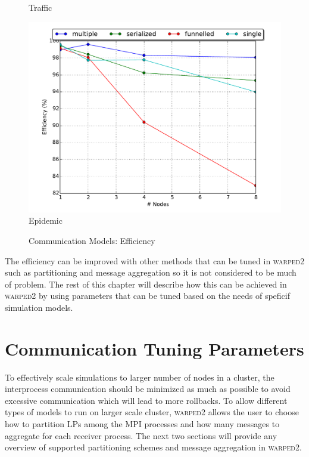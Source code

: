 \documentclass[11pt]{book}
\begin{document}
\begin{figure}
\begin{minipage}{.5\textwidth}
\begin{center}
      Traffic \\
    \end{center}
  \end{minipage}
  \centering
  \begin{minipage}{.5\textwidth}
    \begin{center}
      \includegraphics[width=\textwidth,keepaspectratio,quiet]{figs/partitioning_communication/communication_epidemic_efficiency.pdf} \\
      Epidemic \\
    \end{center}
  \end{minipage}
  \caption{Communication Models: Efficiency}\label{communication_model_efficiency}
\end{figure}

The efficiency can be improved with other methods that can be tuned in \textsc{warped2} such as
partitioning and message aggregation so it is not considered to be much of problem.  The rest of
this chapter will describe how this can be achieved in \textsc{warped2} by using parameters that can
be tuned based on the needs of speficif simulation models.

\section{Communication Tuning Parameters}

To effectively scale simulations to larger number of nodes in a cluster, the interprocess
communication should be minimized as much as possible to avoid excessive communication which will
lead to more rollbacks.  To allow different types of models to run on larger scale cluster,
\textsc{warped2} allows the user to choose how to partition LPs among the MPI processes and how many
messages to aggregate for each receiver process.  The next two sections will provide any overview of
supported partitioning schemes and message aggregation in \textsc{warped2}.
\end{document}
